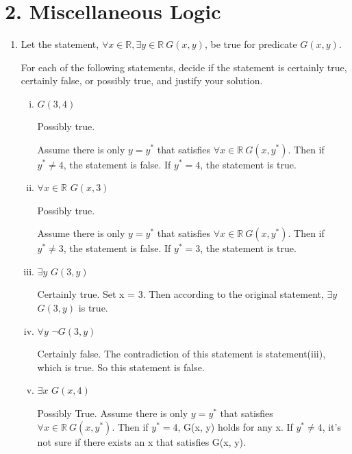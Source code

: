 \documentclass{article}\usepackage{amsmath,amssymb,amsthm,tikz,tkz-graph,color,chngpage,soul,hyperref,csquotes,graphicx,floatrow, yfonts}\newcommand*{\QEDB}{\hfill\ensuremath{\square}}\newtheorem*{prop}{Proposition}\renewcommand{\theenumi}{\alph{enumi}}\usepackage[shortlabels]{enumitem}\usepackage[nobreak=true, framemethod=tikz]{mdframed}\usetikzlibrary{matrix,calc, automata, positioning}\MakeOuterQuote{"}\usepackage[margin=1in]{geometry} \newtheorem{theorem}{Theorem}
\begin{document}
\section*{2. Miscellaneous Logic}
\begin{enumerate}
\item Let the statement, $\forall x \in \mathbb{R}, \exists y \in \mathbb{R} \  G(x,y)$, be
true for predicate $G(x,y)$. 

For each of the following statements, decide if the statement is certainly true, certainly false, or possibly true, and justify your solution.

\begin{enumerate}[(i)]

  \item
  $G(3,4)$
  \begin{mdframed}
   Possibly true. \par
   Assume there is only $y = y^*$ that satisfies $ \forall x \in \mathbb{R} \ G(x,y^*)$. Then if $y^* \neq 4$, the statement is false. If $y^* = 4$, the statement is true.
  \end{mdframed}

  \item
  $\forall x \in \mathbb{R}$ $G(x,3)$
  \begin{mdframed}
  Possibly true. \par
   Assume there is only $y = y^*$ that satisfies $ \forall x \in \mathbb{R} \ G(x,y^*)$. Then if $y^* \neq 3$, the statement is false. If $y^* = 3$, the statement is true.
  \end{mdframed}

  \item
  $\exists y$ $G(3,y)$
  \begin{mdframed}
  Certainly true.
  Set x = 3. Then according to the original statement, $\exists y$ $G(3,y)$ is true.
  \end{mdframed}

  \item
  $\forall y$ $\neg G(3,y)$
  \begin{mdframed}
  Certainly false.
  The contradiction of this statement is statement(iii), which is true. So this statement is false.
  \end{mdframed}

  \item
  $\exists x$ $G(x,4)$
  \begin{mdframed}
  Possibly True.
  Assume there is only $y = y^*$ that satisfies $ \forall x \in \mathbb{R} \ G(x,y^*)$. Then if $y^* = 4$, G(x, y) holds for any x. If $y^* \neq 4$, it's not sure if there exists an x that satisfies G(x, y).
  \end{mdframed}


\end{enumerate}
\end{enumerate}
\end{document}
